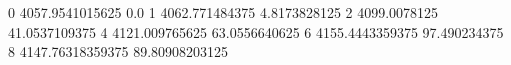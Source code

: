 0 4057.9541015625 0.0
1 4062.771484375 4.8173828125
2 4099.0078125 41.0537109375
4 4121.009765625 63.0556640625
6 4155.4443359375 97.490234375
8 4147.76318359375 89.80908203125
